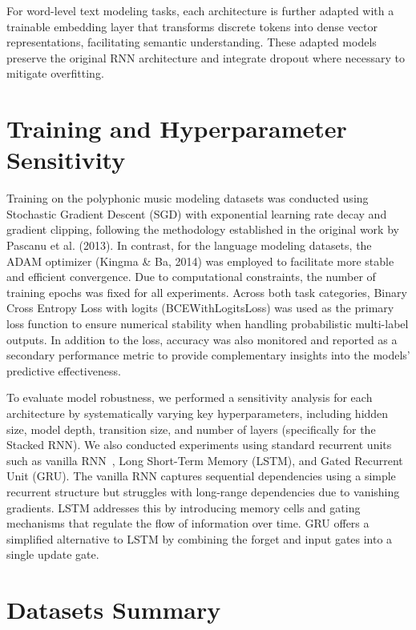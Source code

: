 \documentclass{article}
\begin{document}
For word-level text modeling tasks, each architecture is further adapted with a trainable embedding layer that transforms discrete tokens into dense vector representations, facilitating semantic understanding. These adapted models preserve the original RNN architecture and integrate dropout where necessary to mitigate overfitting.


\section{Training and Hyperparameter Sensitivity}

Training on the polyphonic music modeling datasets was conducted using Stochastic Gradient Descent (SGD)\cite{bottou2012stochastic} with exponential learning rate decay and gradient clipping, following the methodology established in the original work by Pascanu et al. (2013). In contrast, for the language modeling datasets, the ADAM\cite{kingma2014adam} optimizer (Kingma \& Ba, 2014) was employed to facilitate more stable and efficient convergence.
Due to computational constraints, the number of training epochs was fixed for all experiments. Across both task categories, Binary Cross Entropy Loss with logits (BCEWithLogitsLoss\cite{bcewithlogitsloss}) was used as the primary loss function to ensure numerical stability when handling probabilistic multi-label outputs. In addition to the loss, accuracy was also monitored and reported as a secondary performance metric to provide complementary insights into the models' predictive effectiveness.


To evaluate model robustness, we performed a sensitivity analysis for each architecture by systematically varying key hyperparameters, including hidden size, model depth, transition size, and number of layers (specifically for the Stacked RNN). We also conducted experiments using standard recurrent units such as vanilla RNN~\cite{elman1990finding}, Long Short-Term Memory (LSTM), and Gated Recurrent Unit (GRU). The vanilla RNN captures sequential dependencies using a simple recurrent structure but struggles with long-range dependencies due to vanishing gradients. LSTM addresses this by introducing memory cells and gating mechanisms that regulate the flow of information over time. GRU offers a simplified alternative to LSTM by combining the forget and input gates into a single update gate.


\section{Datasets Summary}
\end{document}
